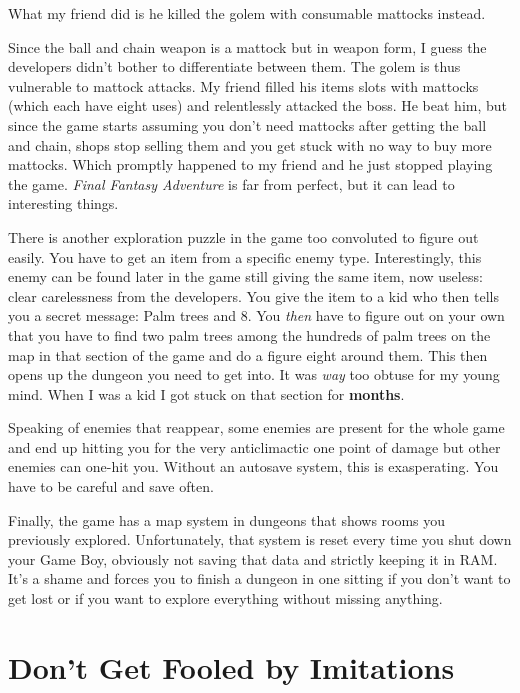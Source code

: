 \documentclass{book}
\begin{document}
What my friend did is he killed the golem with consumable mattocks instead.

Since the ball and chain weapon is a mattock but in weapon form, I guess the developers didn’t bother to differentiate between them. The golem is thus vulnerable to mattock attacks. My friend filled his items slots with mattocks (which each have eight uses) and relentlessly attacked the boss. He beat him, but since the game starts assuming you don’t need mattocks after getting the ball and chain, shops stop selling them and you get stuck with no way to buy more mattocks. Which promptly happened to my friend and he just stopped playing the game. \emph{Final Fantasy Adventure} is far from perfect, but it can lead to interesting things.

There is another exploration puzzle in the game too convoluted to figure out easily. You have to get an item from a specific enemy type. Interestingly, this enemy can be found later in the game still giving the same item, now useless: clear carelessness from the developers. You give the item to a kid who then tells you a secret message: Palm trees and 8. You \emph{then} have to figure out on your own that you have to find two palm trees among the hundreds of palm trees on the map in that section of the game and do a figure eight around them. This then opens up the dungeon you need to get into. It was \emph{way} too obtuse for my young mind. When I was a kid I got stuck on that section for \textbf{months}.

Speaking of enemies that reappear, some enemies are present for the whole game and end up hitting you for the very anticlimactic one point of damage but other enemies can one-hit you. Without an autosave system, this is exasperating. You have to be careful and save often.

Finally, the game has a map system in dungeons that shows rooms you previously explored. Unfortunately, that system is reset every time you shut down your Game Boy, obviously not saving that data and strictly keeping it in RAM. It’s a shame and forces you to finish a dungeon in one sitting if you don’t want to get lost or if you want to explore everything without missing anything.

\FloatBarrier\needspace{10mm}\section*{Don’t Get Fooled by Imitations}\nopagebreak[4]
\end{document}
